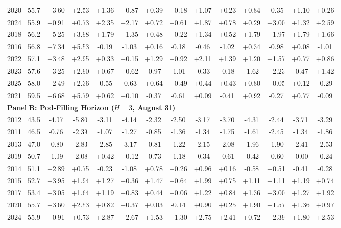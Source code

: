 \begin{table}[htbp]
\begin{tabular*}{\textwidth}{@{\extracolsep{\fill}} c c cc cc cc cc cc cc @{}}
2020 & 55.7 & +3.60 & +2.53 & +1.36 & +0.87 & +0.39 & +0.18 & +1.07 & +0.23 & +0.84 & -0.35 & +1.10 & +0.26 \\
2024 & 55.9 & +0.91 & +0.73 & +2.35 & +2.17 & +0.72 & +0.61 & +1.87 & +0.78 & +0.29 & +3.00 & +1.32 & +2.59 \\
2018 & 56.2 & +5.25 & +3.98 & +1.79 & +1.35 & +0.48 & +0.22 & +1.34 & +0.52 & +1.79 & +1.97 & +1.79 & +1.66 \\
2016 & 56.8 & +7.34 & +5.53 & -0.19 & -1.03 & +0.16 & -0.18 & -0.46 & -1.02 & +0.34 & -0.98 & +0.08 & -1.01 \\
2022 & 57.1 & +3.48 & +2.95 & +0.33 & +0.15 & +1.29 & +0.92 & +2.11 & +1.39 & +1.20 & +1.57 & +0.77 & +0.86 \\
2023 & 57.6 & +3.25 & +2.90 & +0.67 & +0.62 & -0.97 & -1.01 & -0.33 & -0.18 & -1.62 & +2.23 & -0.47 & +1.42 \\
2025 & 58.0 & +2.49 & +2.36 & -0.55 & -0.63 & +0.64 & +0.49 & +0.44 & +0.43 & +0.80 & +0.05 & +0.12 & -0.29 \\
2021 & 59.5 & +6.68 & +5.79 & +0.62 & +0.10 & -0.37 & -0.61 & +0.09 & -0.41 & +0.92 & -0.27 & +0.77 & -0.09 \\
\midrule
\multicolumn{14}{l}{\textbf{Panel B: Pod-Filling Horizon ($H=3$, August 31)}} \\
2012 & 43.5 & -4.07 & -5.80 & -3.11 & -4.14 & -2.32 & -2.50 & -3.17 & -3.70 & -4.31 & -2.44 & -3.71 & -3.29 \\
2011 & 46.5 & -0.76 & -2.39 & -1.07 & -1.27 & -0.85 & -1.36 & -1.34 & -1.75 & -1.61 & -2.45 & -1.34 & -1.86 \\
2013 & 47.0 & -0.80 & -2.83 & -2.85 & -3.17 & -0.81 & -1.22 & -2.15 & -2.08 & -1.96 & -1.90 & -2.41 & -2.53 \\
2019 & 50.7 & -1.09 & -2.08 & +0.42 & +0.12 & -0.73 & -1.18 & -0.34 & -0.61 & -0.42 & -0.60 & -0.00 & -0.24 \\
2014 & 51.1 & +2.89 & +0.75 & -0.23 & -1.08 & +0.78 & +0.26 & +0.96 & +0.16 & -0.58 & +0.51 & -0.41 & -0.28 \\
2015 & 52.7 & +3.95 & +1.94 & +1.27 & +0.36 & +1.47 & +0.64 & +1.99 & +0.75 & +1.11 & +1.11 & +1.19 & +0.74 \\
2017 & 53.4 & +3.05 & +1.64 & +1.19 & +0.83 & +0.44 & +0.06 & +1.22 & +0.84 & +1.36 & +3.00 & +1.27 & +1.92 \\
2020 & 55.7 & +3.60 & +2.53 & +0.82 & +0.37 & +0.03 & -0.14 & +0.90 & +0.25 & +1.90 & +1.57 & +1.36 & +0.97 \\
2024 & 55.9 & +0.91 & +0.73 & +2.87 & +2.67 & +1.53 & +1.30 & +2.75 & +2.41 & +0.72 & +2.39 & +1.80 & +2.53 \\

\end{tabular*}
\end{table}
